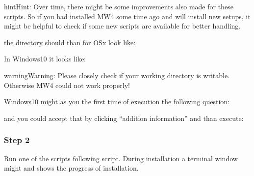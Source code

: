 \documentclass[a4paper,10pt,english]{sphinxmanual}
\begin{document}
\begin{sphinxadmonition}{hint}{Hint:}
\sphinxAtStartPar
Over time, there might be some improvements also made for these scripts.
So if you had installed MW4 some time ago and will install new setups,
it might be helpful to check if some new scripts are available for better
handling.
\end{sphinxadmonition}

\sphinxAtStartPar
the directory should than for OSx look like:


\sphinxAtStartPar
In Windows10 it looks like:


\begin{sphinxadmonition}{warning}{Warning:}
\sphinxAtStartPar
Please closely check if your working directory is writable. Otherwise MW4 could
not work properly!
\end{sphinxadmonition}


\sphinxAtStartPar
Windows10 might as you the first time of execution the following question:


\sphinxAtStartPar
and you could accept that by clicking “addition information” and than execute:



\subsubsection{Step 2}
\label{\detokenize{install/mw4:step-2}}
\sphinxAtStartPar
Run one of the scripts following script. During installation a terminal window
might and shows the progress of installation.
\end{document}
